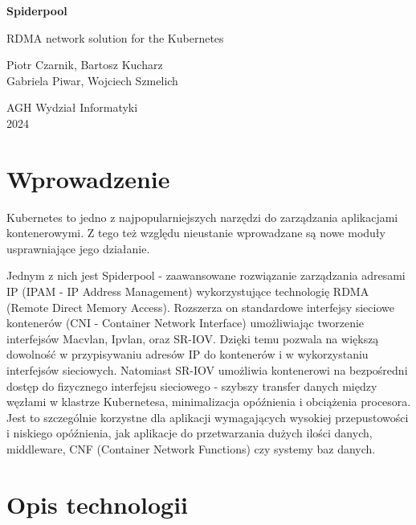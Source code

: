 \documentclass[onecolumn,12pt]{article}
\begin{document}
\begin{titlepage}
\begin{center}
\vspace*{2.5cm}
\Huge
\textbf{Spiderpool}
            
\vspace{0.5cm}
\LARGE
RDMA network solution for the Kubernetes
            
\vspace{1.5cm}

\large
Piotr Czarnik, Bartosz Kucharz
\\Gabriela Piwar, Wojciech Szmelich
              
\vspace{0.8cm}          
\Large
AGH Wydział Informatyki\\
2024    
\end{center}
\end{titlepage}

\tableofcontents
\thispagestyle{empty}

\section{Wprowadzenie}
Kubernetes to jedno z najpopularniejszych narzędzi do zarządzania aplikacjami kontenerowymi. 
Z tego też względu nieustanie wprowadzane są nowe moduły usprawniające jego działanie. 

Jednym z nich jest Spiderpool - zaawansowane rozwiązanie zarządzania adresami IP (IPAM - IP Address Management) wykorzystujące technologię RDMA (Remote Direct Memory Access).
Rozszerza on standardowe interfejsy sieciowe kontenerów (CNI - Container Network Interface) umożliwiając tworzenie interfejsów Macvlan, Ipvlan, oraz SR-IOV.
Dzięki temu pozwala na większą dowolność w przypisywaniu adresów IP do kontenerów i w wykorzystaniu interfejsów sieciowych.
Natomiast SR-IOV umożliwia kontenerowi na bezpośredni dostęp do fizycznego interfejsu sieciowego - szybszy transfer danych między węzłami w klastrze Kubernetesa, minimalizacja opóźnienia i obciążenia procesora. 
Jest to szczególnie korzystne dla aplikacji wymagających wysokiej przepustowości i niskiego opóźnienia, 
jak aplikacje do przetwarzania dużych ilości danych, middleware, CNF (Container Network Functions) czy systemy baz danych.

\section{Opis technologii}
\end{document}

